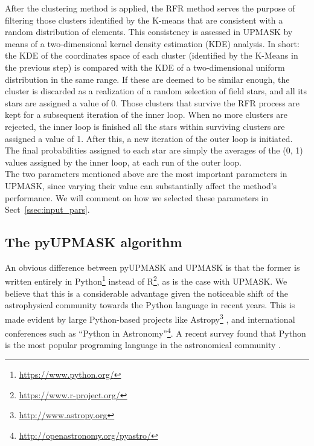 \documentclass[draft]{aa}
\begin{document}
 After the clustering method is applied, the RFR method serves the purpose of
 filtering those clusters identified by the K-means that are consistent
 with a random distribution of elements. This consistency is assessed in UPMASK
 by means of a two-dimensional kernel density estimation (KDE) analysis. In
 short: the KDE of the coordinates space of each cluster (identified by the
 K-Means in the previous step) is compared with the KDE of a two-dimensional
 uniform distribution in the same range. If these are deemed to be similar
 enough, the cluster is discarded as a realization of a random selection of
 field stars, and all its stars are assigned a value of 0. Those
 clusters that survive the RFR process are kept for a subsequent iteration of
 the inner loop. When no more clusters are rejected, the inner loop is finished
 all the stars within surviving clusters are assigned a value of 1. After this,
 a new iteration of the outer loop is initiated.
 The final probabilities assigned to each star are simply the averages of the
 (0, 1) values assigned by the inner loop, at each run of the outer loop.\\

 The two parameters mentioned above are the most important parameters in
 UPMASK, since varying their value can substantially affect the
 method's performance. We will comment on how we selected these
 parameters in Sect~\ref{ssec:input_pars}.



\subsection{The pyUPMASK algorithm}
 \label{ssec:pyupmask}

  An obvious difference between pyUPMASK and UPMASK is that the former is
  written entirely in Python\footnote{\url{https://www.python.org/}} instead
  of R\footnote{\url{https://www.r-project.org/}}, as is the case with UPMASK.
  We believe that this is a considerable advantage given the noticeable shift
  of the astrophysical community towards the Python language in recent years.
  This is made evident by large Python-based projects like
  Astropy\footnote{\url{http://www.astropy.org}} \citep{astropy:2013,
  astropy:2018},
  and international conferences such as ``Python in
  Astronomy''\footnote{\url{http://openastronomy.org/pyastro/}}. A recent
  survey found that Python is the most popular programing language in the
  astronomical community \citep{Momcheva2015,Tollerud2019SustainingCS}.
\end{document}
